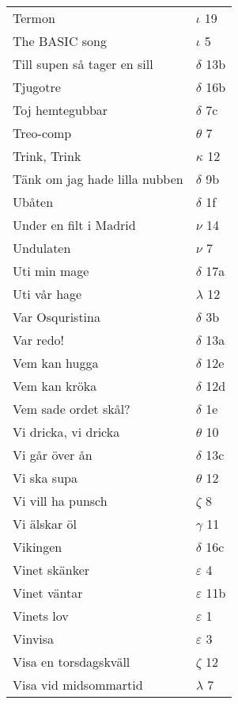 \documentclass[a6paper,10pt]{article}
\begin{document}
\newpage
\setlength{\oddsidemargin}{-0.47in}
\begin{table}[!h]
\begin{tabular}{l l}
Termon&	$\iota$ 19\\
The BASIC song	&$\iota$ 5\\
Till supen så tager en sill	&$\delta$ 13b\\
Tjugotre	&$\delta$ 16b\\
Toj hemtegubbar	&$\delta$ 7c\\
Treo-comp	&$\theta$ 7\\
Trink, Trink&	$\kappa$ 12\\
Tänk om jag hade lilla nubben&	$\delta$ 9b\\
Ubåten	&$\delta$ 1f\\
Under en filt i Madrid	&$\nu$ 14\\
Undulaten&	$\nu$ 7\\
Uti min mage	&$\delta$ 17a\\
Uti vår hage	&$\lambda$ 12\\
Var Osquristina	&$\delta$ 3b\\
Var redo!	&$\delta$ 13a\\
Vem kan hugga	&$\delta$ 12e\\
Vem kan kröka	&$\delta$ 12d\\
Vem sade ordet skål?	&$\delta$ 1e\\
Vi dricka, vi dricka&	$\theta$ 10\\
Vi går över ån	&$\delta$ 13c\\
Vi ska supa	&$\theta$ 12\\
Vi vill ha punsch	&$\zeta$ 8\\
Vi älskar öl	&$\gamma$ 11\\
Vikingen	&$\delta$ 16c\\
Vinet skänker	&$\varepsilon$ 4\\
Vinet väntar	&$\varepsilon$ 11b\\
Vinets lov	&$\varepsilon$ 1\\
Vinvisa	&$\varepsilon$ 3\\
Visa en torsdagskväll	&$\zeta$ 12\\
Visa vid midsommartid &$\lambda$ 7\\
\end{tabular}
\end{table}
\newpage
\setlength{\oddsidemargin}{-0.37in}
\end{document}
